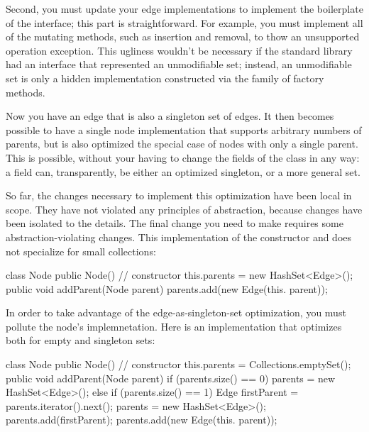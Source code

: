 Second, you must update your edge implementations to implement the boilerplate of
the  interface; this part is straightforward. For example,
you must implement all of the mutating methods, such as insertion and removal,
to thow an unsupported operation exception. This ugliness wouldn't be necessary
if the standard library had an interface that represented an unmodifiable set;
instead, an unmodifiable set is only a hidden implementation constructed via
the  family of factory methods.

Now you have an edge that is also a singleton set of edges. It then becomes
possible to have a single node implementation that supports arbitrary numbers of
parents, but is also optimized the special case of nodes with only a single
parent. This is possible, without your having to change the fields of the
 class in any way: a field  can,
transparently, be either an optimized singleton, or a more general set.

So far, the changes necessary to implement this optimization have been local in
scope. They have not violated any principles of abstraction, because changes have
been isolated to the  details. The final change you need to make
requires some abstraction-violating changes. This implementation of the
constructor and  does not specialize for small collections:

\begin{shortlisting}
class Node {
  public Node() { // constructor
     this.parents = new HashSet<Edge>();
  }
  public void addParent(Node parent) {
     parents.add(new Edge(this. parent));
  }
}
\end{shortlisting} 

In order to take advantage of the edge-as-singleton-set optimization, you must
pollute the node's  implemnetation. Here is an implementation
that optimizes both for empty and singleton sets:

\begin{shortlisting}
class Node {
  public Node() { // constructor
     this.parents = Collections.emptySet();
  }
  public void addParent(Node parent) {
     if (parents.size() == 0) parents = new HashSet<Edge>();
     else if (parents.size() == 1) {
        Edge firstParent = parents.iterator().next();
        parents = new HashSet<Edge>();
        parents.add(firstParent);
     }
     parents.add(new Edge(this. parent));
  }
}
\end{shortlisting} 

